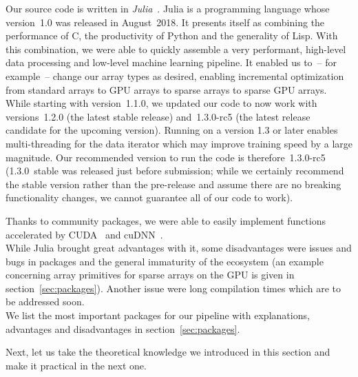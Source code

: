Our source code is written in
\emph{Julia}~\cite{bezansonJuliaFreshApproach2017}. Julia is a
programming language whose version~1.0 was released in August~2018. It
presents itself as combining the performance of C, the productivity of
Python and the generality of Lisp. With this combination, we were able
to quickly assemble a very performant, high-level data processing and
low-level machine learning pipeline. It enabled us to~-- for example~--
change our array types as desired, enabling incremental optimization
from standard arrays to GPU arrays to sparse arrays to sparse GPU
arrays. While starting with version~1.1.0, we updated our code to now
work with versions~1.2.0 (the latest stable release)
and~\mbox{1.3.0-rc5} (the latest release candidate for the upcoming
version). Running on a version 1.3 or later enables multi-threading
for the data iterator which may improve training speed by a large
magnitude. Our recommended version to run the code is
therefore~\mbox{1.3.0-rc5} (1.3.0~stable was released just before
submission; while we certainly recommend the stable version rather
than the pre-release and assume there are no breaking functionality
changes, we cannot guarantee all of our code to work).

Thanks to community packages, we were able to easily implement
functions accelerated by CUDA~\cite{CUDAToolkit2013} and
cuDNN~\cite{NVIDIACuDNN2014}. \\
While Julia brought great advantages with it, some disadvantages were
issues and bugs in packages and the general immaturity of the
ecosystem (an example concerning array primitives for sparse arrays on
the GPU is given in section~\ref{sec:packages}). Another issue were
long compilation times which are to be addressed soon. \\
We list the most important packages for our pipeline with
explanations, advantages and disadvantages in
section~\ref{sec:packages}.

Next, let us take the theoretical knowledge we introduced in this
section and make it practical in the next one.


